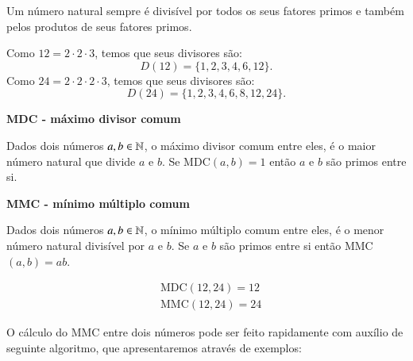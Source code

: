  \begin{obs}
 Um número natural sempre é divisível por todos os seus fatores primos e também pelos produtos de seus fatores primos.
 \end{obs}
 
 \begin{exem} 
 Como $12= 2 \cdot 2 \cdot 3$, temos que seus divisores são: \[D(12)= \{1, 2, 3, 4, 6, 12\}.\]
 Como $24= 2 \cdot 2 \cdot 2 \cdot 3$, temos que seus divisores são: \[D(24)= \{1, 2, 3, 4, 6, 8, 12, 24\}.\]
 \end{exem}
 
 \vskip0.3cm
 \colorbox{azul}{
 \begin{minipage}{14.5cm}
 \begin{center}
  \textbf{MDC - máximo divisor comum}
 
  Dados dois números $a, b \in \mathbb{N}$, o máximo divisor comum entre eles, é o maior número natural que divide $a$ e $b$. Se MDC$(a, b)= 1$ então $a$ e $b$ são primos entre si.
 \end{center}
 \end{minipage}}
 
 \vskip0.3cm
 
 \colorbox{azul}{
 \begin{minipage}{14.5cm}
 \begin{center}
 \textbf{MMC - mínimo múltiplo comum}
 
 Dados dois números $a, b \in \mathbb{N}$, o mínimo múltiplo comum entre eles, é o menor número natural divisível por $a$ e $b$. Se $a$ e $b$ são primos entre si então MMC$(a, b)= ab$.
 \end{center}
 \end{minipage}}
 
 
 \begin{exem} 
 \begin{align*} 
 & \text{MDC}(12, 24)= 12 \\
 & \text{MMC}(12, 24)= 24
 \end{align*}
 \end{exem}
 
 O cálculo do MMC entre dois números pode ser feito rapidamente com auxílio de seguinte algoritmo, que apresentaremos através de exemplos:
 
